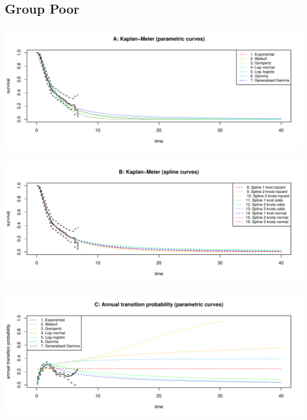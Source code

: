 \documentclass[
]{article}
\begin{document}
\clearpage

\hypertarget{group-poor}{%
\subsection{Group Poor}\label{group-poor}}

\begin{flushleft}\includegraphics[height=0.29\textheight]{Images/validate_extrapolation3-1} \end{flushleft}

\begin{flushleft}\includegraphics[height=0.29\textheight]{Images/validate_extrapolation3-2} \end{flushleft}

\begin{flushleft}\includegraphics[height=0.29\textheight]{Images/validate_extrapolation3-3} \end{flushleft}
\end{document}
